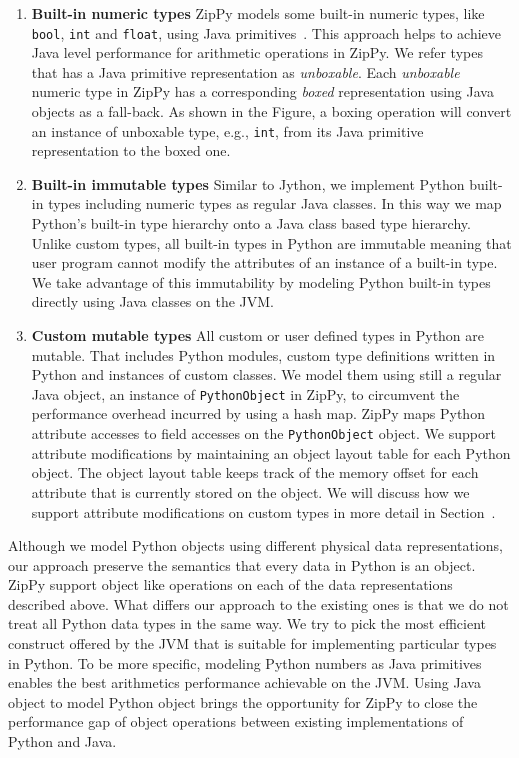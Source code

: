 \begin{enumerate}

\item \textbf{Built-in numeric types}
ZipPy models some built-in numeric types, like \texttt{bool}, \texttt{int} and \texttt{float}, using Java primitives~\cite{Zhang+2014}.
This approach helps to achieve Java level performance for arithmetic operations in ZipPy.
We refer types that has a Java primitive representation as \emph{unboxable}.
Each \emph{unboxable} numeric type in ZipPy has a corresponding \emph{boxed} representation using Java objects as a fall-back.
As shown in the Figure, a boxing operation will convert an instance of unboxable type, e.g., \texttt{int}, from its Java primitive representation to the boxed one.

\item \textbf{Built-in immutable types}
Similar to Jython, we implement Python built-in types including numeric types as regular Java classes.
In this way we map Python's built-in type hierarchy onto a Java class based type hierarchy.
Unlike custom types, all built-in types in Python are immutable meaning that user program cannot modify the attributes of an instance of a built-in type.
We take advantage of this immutability by modeling Python built-in types directly using Java classes on the JVM.

\item \textbf{Custom mutable types}
All custom or user defined types in Python are mutable.
That includes Python modules, custom type definitions written in Python and instances of custom classes.
We model them using still a regular Java object, an instance of \texttt{PythonObject} in ZipPy, to circumvent the performance overhead incurred by using a hash map.
ZipPy maps Python attribute accesses to field accesses on the \texttt{PythonObject} object.
We support attribute modifications by maintaining an object layout table for each Python object.
The object layout table keeps track of the memory offset for each attribute that is currently stored on the object.
We will discuss how we support attribute modifications on custom types in more detail in Section~.

\end{enumerate}

Although we model Python objects using different physical data representations, our approach preserve the semantics that every data in Python is an object.
ZipPy support object like operations on each of the data representations described above.
What differs our approach to the existing ones is that we do not treat all Python data types in the same way.
We try to pick the most efficient construct offered by the JVM that is suitable for implementing particular types in Python.
To be more specific, modeling Python numbers as Java primitives enables the best arithmetics performance achievable on the JVM.
Using Java object to model Python object brings the opportunity for ZipPy to close the performance gap of object operations between existing implementations of Python and Java.

